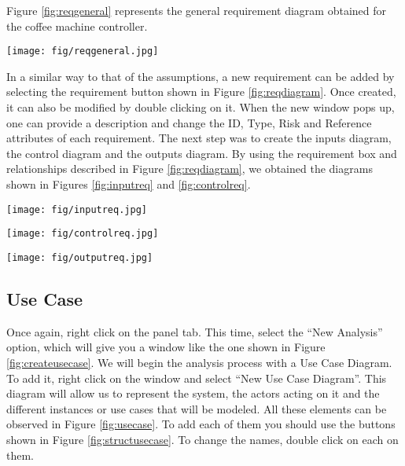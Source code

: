 \documentclass[12pt]{article}
\begin{document}
Figure \ref{fig:reqgeneral} represents the general requirement diagram obtained for the coffee machine controller.

\begin{figure*}[htbp]
\centering
\texttt{[image: fig/reqgeneral.jpg]}
\caption{General Requirement Diagram} \label{fig:reqgeneral}
\end{figure*}


In a similar way to that of the assumptions, a new requirement can be added by selecting the requirement button shown in Figure \ref{fig:reqdiagram}. Once created, it can also be modified by double clicking on it. When the new window pops up, one can provide a description and change the ID, Type, Risk and Reference attributes of each requirement.
	The next step was to create the inputs diagram, the control diagram and the outputs diagram. By using the requirement box and relationships described in Figure \ref{fig:reqdiagram}, we obtained the diagrams shown in Figures \ref{fig:inputreq} and \ref{fig:controlreq}. 

\begin{figure*}[htbp]
\centering
\texttt{[image: fig/inputreq.jpg]}
\caption{Inputs requirements diagram} \label{fig:inputreq}
\end{figure*}

\begin{figure*}[htbp]
\centering
\texttt{[image: fig/controlreq.jpg]}
\caption{Control requirements diagram} \label{fig:controlreq}
\end{figure*}

\begin{figure*}[htbp]
\centering
\texttt{[image: fig/outputreq.jpg]}
\caption{Output requirements diagram} \label{fig:outputreq}
\end{figure*}

\subsection{Use Case}
	Once again, right click on the panel tab. This time, select the “New Analysis” option, which will give you a window like the one shown in Figure \ref{fig:createusecase}. We will begin the analysis process with a Use Case Diagram. To add it, right click on the window and select “New Use Case Diagram”. This diagram will allow us to represent the system, the actors acting on it and the different instances or use cases that will be modeled. All these elements can be observed in Figure \ref{fig:usecase}. To add each of them you should use the buttons shown in Figure \ref{fig:structusecase}. To change the names, double click on each on them.
	
\end{document}

